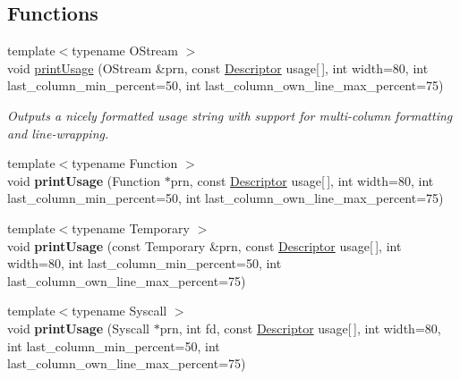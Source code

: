 \subsection*{\-Functions}
\begin{DoxyCompactItemize}
\item 
{\footnotesize template$<$typename O\-Stream $>$ }\\void \hyperlink{namespaceoption_afc8bb7e040a98a0b33ff1ce9da1be0d1}{print\-Usage} (\-O\-Stream \&prn, const \hyperlink{structoption_1_1_descriptor}{\-Descriptor} usage\mbox{[}$\,$\mbox{]}, int width=80, int last\-\_\-column\-\_\-min\-\_\-percent=50, int last\-\_\-column\-\_\-own\-\_\-line\-\_\-max\-\_\-percent=75)
\begin{DoxyCompactList}\small\item\em \-Outputs a nicely formatted usage string with support for multi-\/column formatting and line-\/wrapping. \end{DoxyCompactList}\item 
\hypertarget{namespaceoption_a846de0735717c8402b76d14f0a7a4430}{{\footnotesize template$<$typename Function $>$ }\\void {\bfseries print\-Usage} (\-Function $\ast$prn, const \hyperlink{structoption_1_1_descriptor}{\-Descriptor} usage\mbox{[}$\,$\mbox{]}, int width=80, int last\-\_\-column\-\_\-min\-\_\-percent=50, int last\-\_\-column\-\_\-own\-\_\-line\-\_\-max\-\_\-percent=75)}\label{namespaceoption_a846de0735717c8402b76d14f0a7a4430}

\item 
\hypertarget{namespaceoption_a86e12a019c4da81e5031901af9c800cc}{{\footnotesize template$<$typename Temporary $>$ }\\void {\bfseries print\-Usage} (const \-Temporary \&prn, const \hyperlink{structoption_1_1_descriptor}{\-Descriptor} usage\mbox{[}$\,$\mbox{]}, int width=80, int last\-\_\-column\-\_\-min\-\_\-percent=50, int last\-\_\-column\-\_\-own\-\_\-line\-\_\-max\-\_\-percent=75)}\label{namespaceoption_a86e12a019c4da81e5031901af9c800cc}

\item 
\hypertarget{namespaceoption_a84764f72d05ba8480143043e3d56ad6a}{{\footnotesize template$<$typename Syscall $>$ }\\void {\bfseries print\-Usage} (\-Syscall $\ast$prn, int fd, const \hyperlink{structoption_1_1_descriptor}{\-Descriptor} usage\mbox{[}$\,$\mbox{]}, int width=80, int last\-\_\-column\-\_\-min\-\_\-percent=50, int last\-\_\-column\-\_\-own\-\_\-line\-\_\-max\-\_\-percent=75)}\label{namespaceoption_a84764f72d05ba8480143043e3d56ad6a}


\end{DoxyCompactItemize}
